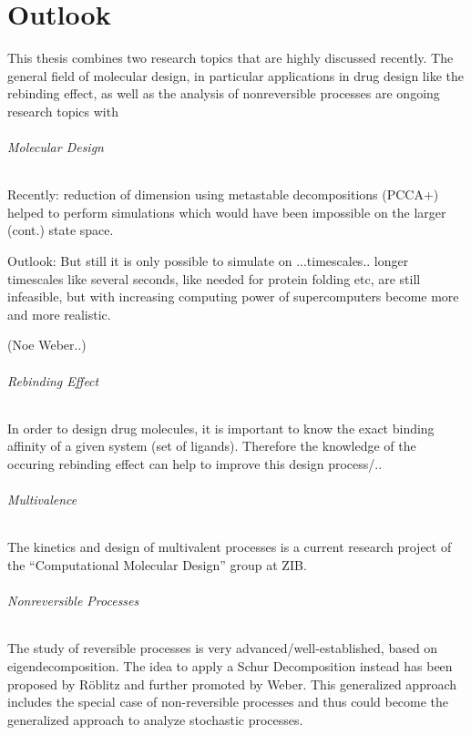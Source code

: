 \chapter*{Outlook} %

This thesis combines two research topics that are highly discussed recently.
The general field of molecular design, in particular applications in drug design like the rebinding effect, as well as the analysis of nonreversible processes are ongoing research topics with 


\subparagraph*{Molecular Design}

Recently: reduction of dimension using metastable decompositions (PCCA+) helped to perform simulations which would have been impossible on the larger (cont.) state space.

Outlook: But still it is only possible to simulate on ...timescales.. longer timescales like several seconds, like needed for protein folding etc, are still infeasible, but with increasing computing power of supercomputers become more and more realistic.

(Noe Weber..)

\subparagraph*{Rebinding Effect}

In order to design drug molecules, it is important to know the exact binding affinity of a given system (set of ligands). Therefore the knowledge of the occuring rebinding effect can help to improve this design process/..

\subparagraph*{Multivalence}

The kinetics and design of multivalent processes is a current research project of the ``Computational Molecular Design'' group at ZIB.

\subparagraph*{Nonreversible Processes}

The study of reversible processes is very advanced/well-established, based on eigendecomposition. %
The idea to apply a Schur Decomposition instead has been proposed by Röblitz and further promoted by Weber. This generalized approach includes the special case of non-reversible processes and thus could become the generalized approach to analyze stochastic processes. %


